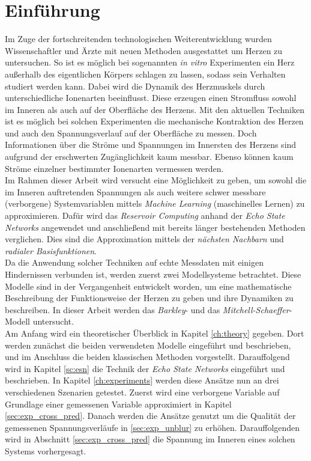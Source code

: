 \chapter{Einführung}



Im Zuge der fortschreitenden technologischen Weiterentwicklung wurden Wissenschaftler und Ärzte mit neuen Methoden ausgestattet um Herzen zu untersuchen. So ist es möglich bei sogenannten \textit{in vitro} Experimenten ein Herz außerhalb des eigentlichen Körpers schlagen zu lassen, sodass sein Verhalten studiert werden kann. Dabei wird die Dynamik des Herzmuskels durch unterschiedliche Ionenarten beeinflusst. Diese erzeugen einen Stromfluss sowohl im Inneren als auch auf der Oberfläche des Herzens. Mit den aktuellen Techniken ist es möglich bei solchen Experimenten die mechanische Kontraktion des Herzen und auch den Spannungsverlauf auf der Oberfläche zu messen. Doch Informationen über die Ströme und Spannungen im Innersten des Herzens sind aufgrund der erschwerten Zugänglichkeit kaum messbar. Ebenso können kaum Ströme einzelner bestimmter Ionenarten vermessen werden. \\

Im Rahmen dieser Arbeit wird versucht eine Möglichkeit zu geben, um sowohl die im Inneren auftretenden Spannungen als auch weitere schwer messbare (verborgene) Systemvariablen mittels \textit{Machine Learning} (maschinelles Lernen) zu approximieren. Dafür wird das \textit{Reservoir Computing} anhand der \textit{Echo State Networks} angewendet und anschließend mit bereits länger bestehenden Methoden verglichen. Dies sind die Approximation mittels der \textit{nächsten Nachbarn} und \textit{radialer Basisfunktionen}.\\
  
Da die Anwendung solcher Techniken auf echte Messdaten mit einigen Hindernissen verbunden ist, werden zuerst zwei Modellsysteme betrachtet. Diese Modelle sind in der Vergangenheit entwickelt worden, um eine mathematische Beschreibung der Funktionsweise der Herzen zu geben und ihre Dynamiken zu beschreiben. In dieser Arbeit werden das \textit{Barkley}- und das \textit{Mitchell-Schaeffer}-Modell untersucht. \\

Am Anfang wird ein theoretischer Überblick in Kapitel \ref{ch:theory} gegeben. Dort werden zunächst die beiden verwendeten Modelle eingeführt und beschrieben, und im Anschluss die beiden klassischen Methoden vorgestellt. Darauffolgend wird in Kapitel \ref{sc:esn} die Technik der \textit{Echo State Networks} eingeführt und beschrieben. In Kapitel \ref{ch:experiments} werden diese Ansätze nun an drei verschiedenen Szenarien getestet. Zuerst wird eine verborgene Variable auf Grundlage einer gemessenen Variable approximiert in Kapitel \ref{sec:exp_cross_pred}. Danach werden die Ansätze genutzt um die Qualität der gemessenen Spannungsverläufe in \ref{sec:exp_unblur} zu erhöhen. Darauffolgenden wird in Abschnitt \ref{sec:exp_cross_pred} die Spannung im Inneren eines solchen Systems vorhergesagt.
